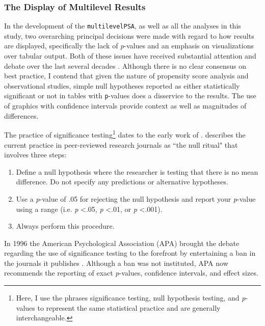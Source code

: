 \documentclass[letterpaper,12pt]{article} %
\begin{document}
\subsubsection{The Display of Multilevel Results}

In the development of the \texttt{multilevelPSA}, as well as all the analyses in this study, two overarching principal decisions were made with regard to how results are displayed, specifically the lack of \textit{p}-values and an emphasis on visualizations over tabular output. Both of these issues have received substantial attention and debate over the last several decades \cite{Shrout1997,Hunter1997,Harris1997,Abelson1997,Scarr1997,Estes1997}. Although there is no clear consensus on best practice, I contend that given the nature of propensity score analysis and observational studies, simple null hypotheses reported as either statistically significant or not in tables with \texttt{p}-values does a disservice to the results. The use of graphics with confidence intervals provide context as well as magnitudes of differences.


The practice of significance testing\footnote{Here, I use the phrases significance testing, null hypothesis testing, and \textit{p}-values to represent the same statistical practice and are generally interchangeable.} dates to the early work of .  describes the current practice in peer-reviewed research journals as ``the null ritual" that involves three steps:

\begin{enumerate}
    \item Define a null hypothesis where the researcher is testing that there is no mean difference. Do not specify any predictions or alternative hypotheses.
    \item Use a \textit{p}-value of .05 for rejecting the null hypothesis and report your \textit{p}-value using a range (i.e. \textit{p} \textless .05, \textit{p} \textless .01, or \textit{p} \textless .001).
    \item Always perform this procedure.
\end{enumerate}

\noindent In 1996 the American Psychological Association (APA) brought the debate regarding the use of significance testing to the forefront by entertaining a ban in the journals it publishes \cite{Shrout1997,Hunter1997,Harris1997,Abelson1997,Scarr1997,Estes1997}. Although a ban was not instituted, APA now recommends the reporting of exact \textit{p}-values, confidence intervals, and effect sizes. 
\end{document}
